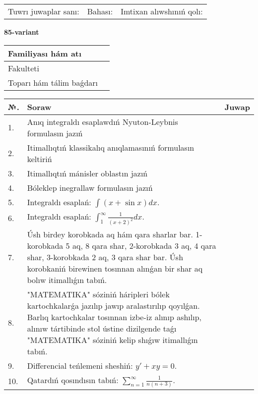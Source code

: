 \documentclass{article}
\begin{document}
\vspace{1cm}

\begin{tabular}{ c c c }
Tuwrı juwaplar sanı: \underline{\hspace{2cm}} & Bahası: \underline{\hspace{2cm}} & Imtixan alıwshınıń qolı: \underline{\hspace{2cm}} \\
\end{tabular}

\newpage

\begin{center}\textbf{85-variant}\end{center}

\bgroup
\def\arraystretch{1.5}
\begin{tabular}{ |m{6cm}|m{10cm}| }
  \hline
  Familiyası hám atı & \\
  \hline
  Fakulteti &\\
  \hline
  Toparı hám tálim baǵdarı & \\
  \hline
\end{tabular}
\egroup

\vspace{0.5cm}

\bgroup
\def\arraystretch{2}
\begin{tabular}{ |l|m{8cm}|m{7cm}| }
  \hline
  №. & Soraw & Juwap \\
  \hline
  1. & Anıq integraldı esaplawdıń Nyuton-Leybnis formulasın jazıń &  \\
  \hline
  2. & Itimallıqtıń klassikalıq anıqlamasınıń formulasın keltiriń &  \\
  \hline
  3. & Itimallıqtıń mánisler oblastın jazıń &  \\
  \hline
  4. & Bóleklep inegrallaw formulasın jazıń &  \\
  \hline
  5. & Integraldı esaplań: $\displaystyle\int (x + \sin x)dx$. &  \\
  \hline
  6. & Integraldı esaplań: $\displaystyle\int_{1}^{\infty}{\frac{1}{\left( x + 2 \right)^{2}}dx }$. &  \\
  \hline
  7. & Úsh birdey korobkada aq hám qara sharlar bar. 1-korobkada 5 aq, 8 qara shar, 2-korobkada 3 aq, 4 qara shar, 3-korobkada 2 aq, 3 qara shar bar. Úsh korobkaniń birewinen tosınnan alınǵan bir shar aq bolıw itimallıǵın tabıń. &  \\
  \hline
  8. & "MATEMATIKA" sóziniń háripleri bólek kartochkalarǵa jazılıp jawıp aralastırılıp qoyılǵan. Barlıq kartochkalar tosınnan izbe-iz alınıp ashılıp, alınıw tártibinde stol ústine dizilgende taǵı "MATEMATIKA" sóziniń kelip shıǵıw itimallıǵın tabıń. &  \\
  \hline
  9. & Differencial teńlemeni sheshiń: $y' + xy = 0$. &  \\
  \hline
  10. & Qatardıń qosındısın tabıń: $\displaystyle\sum_{n = 1}^{\infty}\frac{1}{n(n + 3)}$. &  \\
  \hline
\end{tabular}
\egroup
\end{document}
